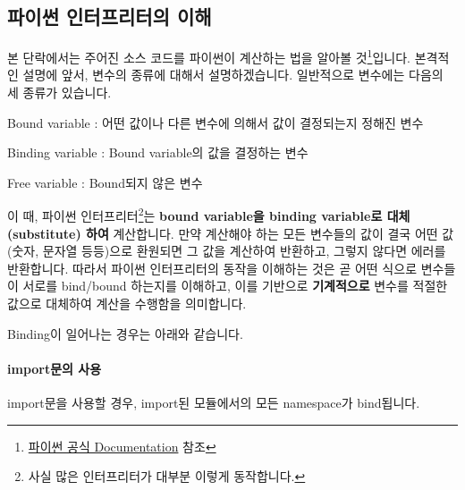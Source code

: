 \documentclass[twoside]{article}
\begin{document}
%

%
%

\subsection{파이썬 인터프리터의 이해}

본 단락에서는 주어진 소스 코드를 파이썬이 계산하는 법을 알아볼 것\footnote{\href{https://docs.python.org/3/reference/executionmodel.html}{파이썬 공식 Documentation} 참조}입니다. 본격적인 설명에 앞서, 변수의 종류에 대해서 설명하겠습니다. 일반적으로 변수에는 다음의 세 종류가 있습니다. 

\begin{compactitem} 
\item Bound variable : 어떤 값이나 다른 변수에 의해서 값이 결정되는지 정해진 변수
\item Binding variable : Bound variable의 값을 결정하는 변수 
\item Free variable : Bound되지 않은 변수 
\end{compactitem}

이 때, 파이썬 인터프리터\footnote{사실 많은 인터프리터가 대부분 이렇게 동작합니다.}는 \textbf{bound variable을 binding variable로 대체(substitute) 하여} 계산합니다. 만약 계산해야 하는 모든 변수들의 값이 결국 어떤 값(숫자, 문자열 등등)으로 환원되면 그 값을 계산하여 반환하고, 그렇지 않다면 에러를 반환합니다. 따라서 파이썬 인터프리터의 동작을 이해하는 것은 곧 어떤 식으로 변수들이 서로를 bind/bound 하는지를 이해하고, 이를 기반으로 \textbf{기계적으로} 변수를 적절한 값으로 대체하여 계산을 수행함을 의미합니다. 

Binding이 일어나는 경우는 아래와 같습니다. 

\paragraph{import문의 사용} import문을 사용할 경우, import된 모듈에서의 모든 namespace가 bind됩니다. 
\end{document}
